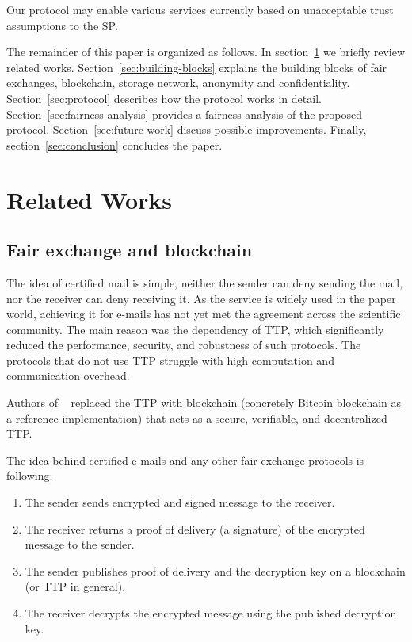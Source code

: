 \documentclass{ieeeaccess}
\begin{document}
Our protocol may enable various services currently based on unacceptable trust assumptions to the SP.

The remainder of this paper is organized as follows.
In section~\ref{sec:related-works} we briefly review related works. 
Section~\ref{sec:building-blocks} explains the building blocks of fair exchanges, blockchain, storage network, anonymity and confidentiality.
Section~\ref{sec:protocol} describes how the protocol works in detail.
Section~\ref{sec:fairness-analysis} provides a fairness analysis of the proposed protocol.
Section~\ref{sec:future-work} discuss possible improvements. 
Finally, section~\ref{sec:conclusion} concludes the paper.


\section{Related Works}\label{sec:related-works}

\subsection{Fair exchange and blockchain}
The idea of certified mail is simple, neither the sender can deny sending the mail, nor the receiver can deny receiving it. As the service is widely used in the paper world, achieving it for e-mails has not yet met the agreement across the scientific community. The main reason was the dependency of TTP, which significantly reduced the performance, security, and robustness of such protocols. The protocols that do not use TTP struggle with high computation and communication overhead.

Authors of ~\cite{hinarejos2019solution} replaced the TTP with blockchain (concretely Bitcoin blockchain as a reference implementation) that acts as a secure, verifiable, and decentralized TTP.

The idea behind certified e-mails and any other fair exchange protocols is following:
\begin{enumerate}
    \item The sender sends encrypted and signed message to the receiver.
    \item The receiver returns a proof of delivery (a signature) of the encrypted message to the sender.
    \item The sender publishes proof of delivery and the decryption key on a blockchain (or TTP in general).
    \item The receiver decrypts the encrypted message using the published decryption key.
\end{enumerate}
\end{document}
